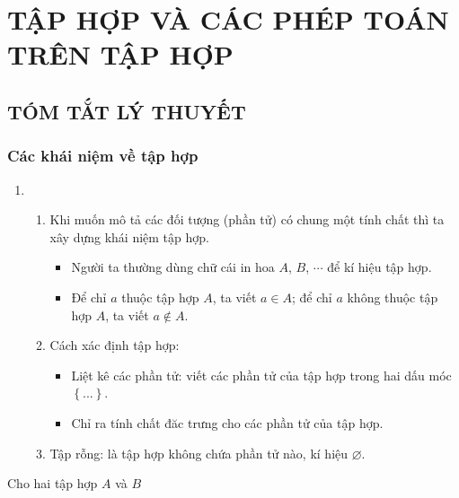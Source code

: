 \section{TẬP HỢP VÀ CÁC PHÉP TOÁN TRÊN TẬP HỢP}

\subsection{TÓM TẮT LÝ THUYẾT}

\subsubsection{Các khái niệm về tập hợp}
\begin{enumerate}[\iconMT]
	\item {}
	\begin{enumerate}[\faPencilSquareO]
		\item Khi muốn mô tả các đối tượng (phần tử) có chung một tính chất thì ta xây dựng khái niệm tập hợp.
		\begin{boxkn}
		\begin{itemize}
			\item  Người ta thường dùng chữ cái in hoa $A$, $B$, $\cdots$ để kí hiệu tập hợp.
			\item  Để chỉ $a$ thuộc tập hợp $A$, ta viết $a \in A$; để chỉ $a$ không thuộc tập hợp $A$, ta viết $a \notin A$.
		\end{itemize}
		\end{boxkn}
		\item Cách xác định tập hợp: 
		\begin{boxkn}
		\begin{itemize}
			\item  Liệt kê các phần tử: viết các phần tử của tập hợp trong hai dấu móc $\left\{...\right\}$.
			\item  Chỉ ra tính chất đăc trưng cho các phần tử của tập hợp.
		\end{itemize}
		\end{boxkn}
		\item Tập rỗng: là tập hợp không chứa phần tử nào, kí hiệu $\varnothing $.
	\end{enumerate}	
\end{enumerate}
Cho hai tập hợp $A$ và $B$
